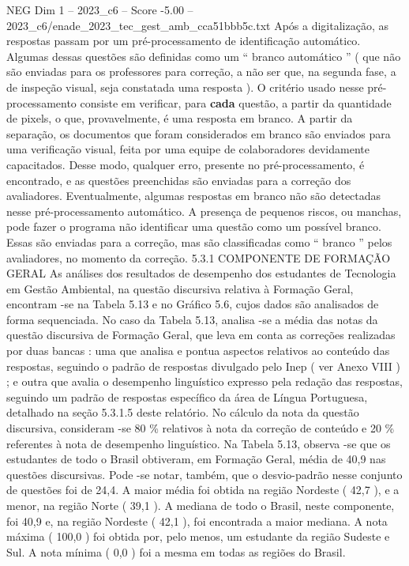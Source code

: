 \begin{textsample}{NEG Dim 1 – 2023\_c6 – Score -5.00 – 2023\_c6/enade\_2023\_tec\_gest\_amb\_cca51bbb5c.txt}
Após a digitalização, as respostas passam por um pré-processamento de identificação automático.
Algumas dessas questões são definidas como um “ branco automático ” ( que não são enviadas para os professores para correção, a não ser que, na segunda fase, a de inspeção visual, seja constatada uma resposta ).
O critério usado nesse pré-processamento consiste em verificar, para \textbf{cada} questão, a partir da quantidade de pixels, o que, provavelmente, é uma resposta em branco.
A partir da separação, os documentos que foram considerados em branco são enviados para uma verificação visual, feita por uma equipe de colaboradores devidamente capacitados.
Desse modo, qualquer erro, presente no pré-processamento, é encontrado, e as questões preenchidas são enviadas para a correção dos avaliadores.
Eventualmente, algumas respostas em branco não são detectadas nesse pré-processamento automático.
A presença de pequenos riscos, ou manchas, pode fazer o programa não identificar uma questão como um possível branco.
Essas são enviadas para a correção, mas são classificadas como “ branco ” pelos avaliadores, no momento da correção. 5.3.1 COMPONENTE DE FORMAÇÃO GERAL As análises dos resultados de desempenho dos estudantes de Tecnologia em Gestão Ambiental, na questão discursiva relativa à Formação Geral, encontram -se na Tabela 5.13 e no Gráfico 5.6, cujos dados são analisados de forma sequenciada.
No caso da Tabela 5.13, analisa -se a média das notas da questão discursiva de Formação Geral, que leva em conta as correções realizadas por duas bancas : uma que analisa e pontua aspectos relativos ao conteúdo das respostas, seguindo o padrão de respostas divulgado pelo Inep ( ver Anexo VIII ) ; e outra que avalia o desempenho linguístico expresso pela redação das respostas, seguindo um padrão de respostas específico da área de Língua Portuguesa, detalhado na seção 5.3.1.5 deste relatório.
No cálculo da nota da questão discursiva, consideram -se 80 \% relativos à nota da correção de conteúdo e 20 \% referentes à nota de desempenho linguístico.
Na Tabela 5.13, observa -se que os estudantes de todo o Brasil obtiveram, em Formação Geral, média de 40,9 nas questões discursivas.
Pode -se notar, também, que o desvio-padrão nesse conjunto de questões foi de 24,4.
A maior média foi obtida na região Nordeste ( 42,7 ), e a menor, na região Norte ( 39,1 ).
A mediana de todo o Brasil, neste componente, foi 40,9 e, na região Nordeste ( 42,1 ), foi encontrada a maior mediana.
A nota máxima ( 100,0 ) foi obtida por, pelo menos, um estudante da região Sudeste e Sul.
A nota mínima ( 0,0 ) foi a mesma em todas as regiões do Brasil.

\end{textsample}

